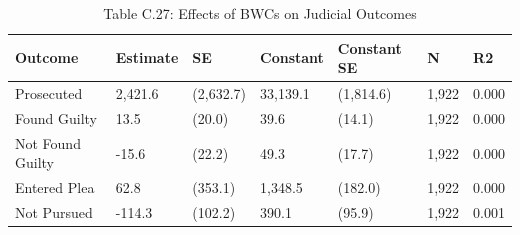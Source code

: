 \begin{table}

\caption{Table C.27: Effects of BWCs on Judicial Outcomes}
\centering
\begin{tabular}[t]{lllllll}
\toprule
Outcome & Estimate & SE & Constant & Constant SE & N & R2\\
\midrule
Prosecuted & 2,421.6 & (2,632.7) & 33,139.1 & (1,814.6) & 1,922 & 0.000\\
Found Guilty & 13.5 & (20.0) & 39.6 & (14.1) & 1,922 & 0.000\\
Not Found Guilty & -15.6 & (22.2) & 49.3 & (17.7) & 1,922 & 0.000\\
Entered Plea & 62.8 & (353.1) & 1,348.5 & (182.0) & 1,922 & 0.000\\
Not Pursued & -114.3 & (102.2) & 390.1 & (95.9) & 1,922 & 0.001\\
\bottomrule
\end{tabular}
\end{table}
